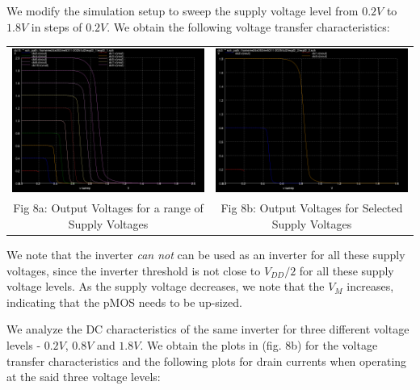 \documentclass[12pt,a4paper]{article}
\begin{document}
\noindent We modify the simulation setup to sweep the supply voltage level from $0.2V$ to $1.8V$ in steps of $0.2V$. We obtain the following voltage transfer characteristics:
\begin{center}
\begin{tabular}{cc}
\includegraphics[width=0.49\linewidth]{tut2/reports/media/expt2_1_vtc.png} &
\includegraphics[width=0.49\linewidth]{tut2/reports/media/expt2_2_vtc.png} \\
Fig 8a: Output Voltages for a range of Supply Voltages & Fig 8b: Output Voltages for Selected Supply Voltages
\end{tabular}
\end{center}

\noindent We note that the inverter \emph{can not} can be used as an inverter for all these supply voltages, since the inverter threshold is not close to $V_{DD}/2$ for all these supply voltage levels. As the supply voltage decreases, we note that the $V_M$ increases, indicating that the pMOS needs to be up-sized.
\newline \newline

\noindent We analyze the DC characteristics of the same inverter for three different voltage levels - $0.2V$, $0.8V$ and $1.8V$. We obtain the plots in (fig. 8b) for the voltage transfer characteristics and the following plots for drain currents when operating at the said three voltage levels:
\end{document}
